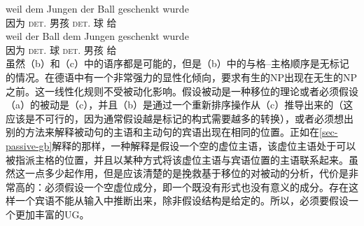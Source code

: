 \ex 
\gll weil dem Jungen der Ball geschenkt wurde\\
     因为 \textsc{det}.\dat{} 男孩 \textsc{det}.\nom{} 球 给 \passivepst\\
\ex 
\gll weil der Ball dem Jungen geschenkt wurde\\
     因为 \textsc{det}.\nom{} 球 \textsc{det}.\dat{} 男孩 给 \passivepst\\
\zl
虽然（b）和（c）中的语序都是可能的，但是（b）中的与格--主格顺序是无标记的情况。在德语中有一个非常强力的显性化倾向，要求有生的NP出现在无生的NP之前\citep[]{Hoberg81a}。这一线性化规则不受被动化影响。假设被动是一种移位的理论或者必须假设（a）的被动是（c），并且（b）是通过一个重新排序操作从（c）推导出来的（这应该是不可行的，因为通常假设越是标记的构式需要越多的转换），或者必须想出别的方法来解释被动句的主语和主动句的宾语出现在相同的位置。正如在\ref{sec-passive-gb}解释的那样，一种解释是假设一个空的虚位主语，该虚位主语处于可以被指派主格的位置，并且以某种方式将该虚位主语与宾语位置的主语联系起来。虽然这一点多少起作用，但是应该清楚的是挽救基于移位的对被动的分析，代价是非常高的：必须假设一个空虚位成分，即一个既没有形式也没有意义的成分。存在这样一个宾语不能从输入中推断出来，除非假设结构是给定的。所以，必须要假设一个更加丰富的UG\indexugc。
